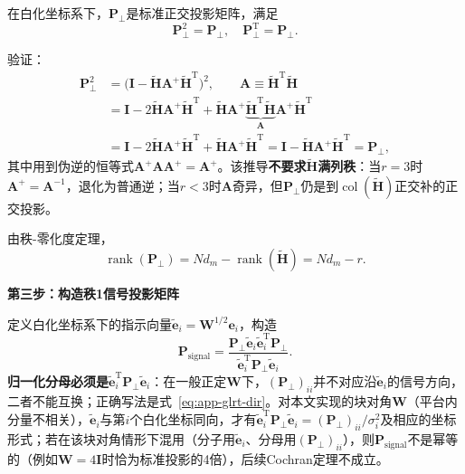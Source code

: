 \documentclass[UTF8,a4paper,zihao=-4]{ctexart}
\begin{document}
在白化坐标系下，\(\mathbf{P}_{\perp}\)是标准正交投影矩阵，满足
\begin{equation}
\mathbf{P}_{\perp}^2 = \mathbf{P}_{\perp}, \quad \mathbf{P}_{\perp}^{\mathrm{T}}=\mathbf{P}_{\perp}.
\end{equation}

验证：
\begin{align}
\mathbf{P}_{\perp}^2 &= \bigl(\mathbf{I}-\widetilde{\mathbf{H}}\mathbf{A}^{+}\widetilde{\mathbf{H}}^{\mathrm{T}}\bigr)^2,\qquad \mathbf{A}\equiv\widetilde{\mathbf{H}}^{\mathrm{T}}\widetilde{\mathbf{H}}\\
&= \mathbf{I} - 2\widetilde{\mathbf{H}}\mathbf{A}^{+}\widetilde{\mathbf{H}}^{\mathrm{T}}
+ \widetilde{\mathbf{H}}\mathbf{A}^{+}\underbrace{\widetilde{\mathbf{H}}^{\mathrm{T}}\widetilde{\mathbf{H}}}_{\mathbf{A}}\mathbf{A}^{+}\widetilde{\mathbf{H}}^{\mathrm{T}} \\
&= \mathbf{I} - 2\widetilde{\mathbf{H}}\mathbf{A}^{+}\widetilde{\mathbf{H}}^{\mathrm{T}}
+ \widetilde{\mathbf{H}}\mathbf{A}^{+}\widetilde{\mathbf{H}}^{\mathrm{T}}
= \mathbf{I} - \widetilde{\mathbf{H}}\mathbf{A}^{+}\widetilde{\mathbf{H}}^{\mathrm{T}} = \mathbf{P}_{\perp},
\end{align}
其中用到伪逆的恒等式\(\mathbf{A}^{+}\mathbf{A}\mathbf{A}^{+}=\mathbf{A}^{+}\)。该推导\textbf{不要求\(\widetilde{\mathbf{H}}\)满列秩}：当\(r=3\)时\(\mathbf{A}^{+}=\mathbf{A}^{-1}\)，退化为普通逆；当\(r<3\)时\(\mathbf{A}\)奇异，但\(\mathbf{P}_{\perp}\)仍是到\(\operatorname{col}(\widetilde{\mathbf{H}})\)正交补的正交投影。

由秩-零化度定理，
\begin{equation}
\operatorname{rank}(\mathbf{P}_{\perp}) = Nd_m - \operatorname{rank}(\widetilde{\mathbf{H}}) = Nd_m - r.
\end{equation}

\noindent\textbf{第三步：构造秩1信号投影矩阵}\par

定义白化坐标系下的指示向量\(\widetilde{\mathbf{e}}_i=\mathbf{W}^{1/2}\mathbf{e}_i\)，构造
\begin{equation}
\mathbf{P}_{\text{signal}} = \frac{\mathbf{P}_{\perp}\widetilde{\mathbf{e}}_i\widetilde{\mathbf{e}}_i^{\mathrm{T}}\mathbf{P}_{\perp}}{\widetilde{\mathbf{e}}_i^{\mathrm{T}}\mathbf{P}_{\perp}\widetilde{\mathbf{e}}_i}.
\end{equation}
\textbf{归一化分母必须是\(\widetilde{\mathbf{e}}_i^{\mathrm{T}}\mathbf{P}_{\perp}\widetilde{\mathbf{e}}_i\)}：在一般正定\(\mathbf{W}\)下，\((\mathbf{P}_{\perp})_{ii}\)并不对应沿\(\widetilde{\mathbf{e}}_i\)的信号方向，二者不能互换；正确写法是式~\eqref{eq:app-glrt-dir}。对本文实现的块对角\(\mathbf{W}\)（平台内分量不相关），\(\widetilde{\mathbf{e}}_i\)与第\(i\)个白化坐标同向，才有\(\widetilde{\mathbf{e}}_i^{\mathrm{T}}\mathbf{P}_{\perp}\widetilde{\mathbf{e}}_i=(\mathbf{P}_{\perp})_{ii}/\sigma_i^2\)及相应的坐标形式；若在该块对角情形下混用（分子用\(\widetilde{\mathbf{e}}_i\)、分母用\((\mathbf{P}_{\perp})_{ii}\)），则\(\mathbf{P}_{\text{signal}}\)不是幂等的（例如\(\mathbf{W}=4\mathbf{I}\)时恰为标准投影的4倍），后续Cochran定理不成立。
\end{document}
